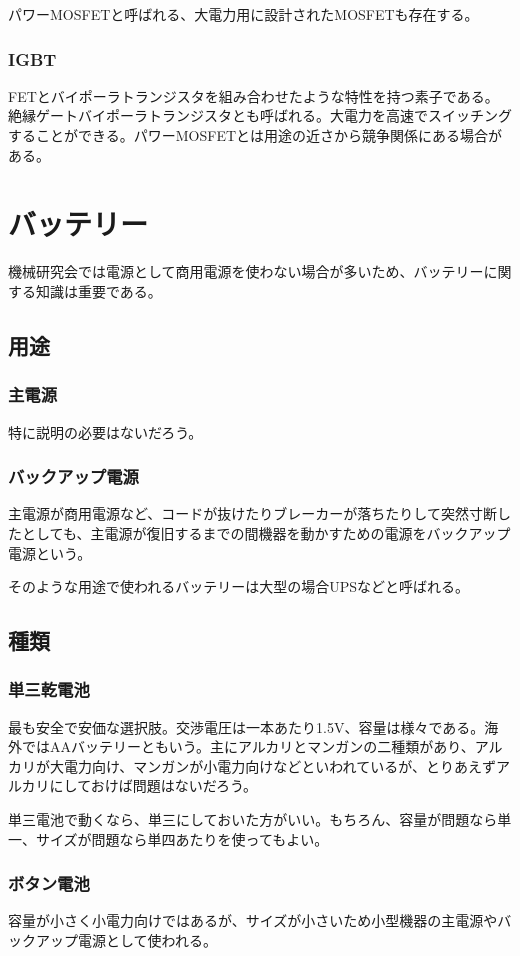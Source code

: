 \documentclass[a4paper,titlepage,here]{ujarticle}
\begin{document}
パワーMOSFETと呼ばれる、大電力用に設計されたMOSFETも存在する。
\subsubsection{IGBT}
FETとバイポーラトランジスタを組み合わせたような特性を持つ素子である。絶縁ゲートバイポーラトランジスタとも呼ばれる。大電力を高速でスイッチングすることができる。パワーMOSFETとは用途の近さから競争関係にある場合がある。
\section{バッテリー}
機械研究会では電源として商用電源を使わない場合が多いため、バッテリーに関する知識は重要である。
\subsection{用途}
\subsubsection{主電源}
特に説明の必要はないだろう。
\subsubsection{バックアップ電源}
主電源が商用電源など、コードが抜けたりブレーカーが落ちたりして突然寸断したとしても、主電源が復旧するまでの間機器を動かすための電源をバックアップ電源という。

そのような用途で使われるバッテリーは大型の場合UPSなどと呼ばれる。
\subsection{種類}
\subsubsection{単三乾電池}
最も安全で安価な選択肢。交渉電圧は一本あたり1.5V、容量は様々である。海外ではAAバッテリーともいう。主にアルカリとマンガンの二種類があり、アルカリが大電力向け、マンガンが小電力向けなどといわれているが、とりあえずアルカリにしておけば問題はないだろう。

単三電池で動くなら、単三にしておいた方がいい。もちろん、容量が問題なら単一、サイズが問題なら単四あたりを使ってもよい。
\subsubsection{ボタン電池}
容量が小さく小電力向けではあるが、サイズが小さいため小型機器の主電源やバックアップ電源として使われる。
\end{document}
